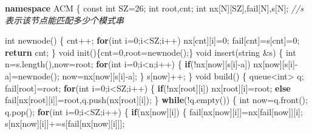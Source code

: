 \documentclass[
]{article}
\newenvironment{Shaded}{}{}
\newcommand{\AttributeTok}[1]{\textcolor[rgb]{0.49,0.56,0.16}{#1}}
\newcommand{\CharTok}[1]{\textcolor[rgb]{0.25,0.44,0.63}{#1}}
\newcommand{\CommentTok}[1]{\textcolor[rgb]{0.38,0.63,0.69}{\textit{#1}}}
\newcommand{\ControlFlowTok}[1]{\textcolor[rgb]{0.00,0.44,0.13}{\textbf{#1}}}
\newcommand{\DataTypeTok}[1]{\textcolor[rgb]{0.56,0.13,0.00}{#1}}
\newcommand{\DecValTok}[1]{\textcolor[rgb]{0.25,0.63,0.44}{#1}}
\newcommand{\KeywordTok}[1]{\textcolor[rgb]{0.00,0.44,0.13}{\textbf{#1}}}
\newcommand{\NormalTok}[1]{#1}
\begin{document}
\begin{Shaded}
\begin{Highlighting}[]
\KeywordTok{namespace}\NormalTok{ ACM}
\NormalTok{\{}
    \AttributeTok{const} \DataTypeTok{int}\NormalTok{ SZ=}\DecValTok{26}\NormalTok{;}
    \DataTypeTok{int}\NormalTok{ root,cnt;}
    \DataTypeTok{int}\NormalTok{ nx[N][SZ],fail[N],s[N];}
    \CommentTok{//s表示该节点能匹配多少个模式串}

    \DataTypeTok{int}\NormalTok{ newnode()}
\NormalTok{    \{}
\NormalTok{        cnt++;}
        \ControlFlowTok{for}\NormalTok{(}\DataTypeTok{int}\NormalTok{ i=}\DecValTok{0}\NormalTok{;i\textless{}SZ;i++)}
\NormalTok{            nx[cnt][i]=}\DecValTok{0}\NormalTok{;}
\NormalTok{        fail[cnt]=s[cnt]=}\DecValTok{0}\NormalTok{;}
        \ControlFlowTok{return}\NormalTok{ cnt;}
\NormalTok{    \}}
    \DataTypeTok{void}\NormalTok{ init()\{cnt=}\DecValTok{0}\NormalTok{,root=newnode();\}}
    \DataTypeTok{void}\NormalTok{ insert(string \&s)}
\NormalTok{    \{}
        \DataTypeTok{int}\NormalTok{ n=s.length(),now=root;}
        \ControlFlowTok{for}\NormalTok{(}\DataTypeTok{int}\NormalTok{ i=}\DecValTok{0}\NormalTok{;i\textless{}n;i++)}
\NormalTok{        \{}
            \ControlFlowTok{if}\NormalTok{(!nx[now][s[i]{-}}\CharTok{\textquotesingle{}a\textquotesingle{}}\NormalTok{])}
\NormalTok{                nx[now][s[i]{-}}\CharTok{\textquotesingle{}a\textquotesingle{}}\NormalTok{]=newnode();}
\NormalTok{            now=nx[now][s[i]{-}}\CharTok{\textquotesingle{}a\textquotesingle{}}\NormalTok{];}
\NormalTok{        \}}
\NormalTok{        s[now]++;}
\NormalTok{    \}}
    \DataTypeTok{void}\NormalTok{ build()}
\NormalTok{    \{}
\NormalTok{        queue\textless{}}\DataTypeTok{int}\NormalTok{\textgreater{} q;}
\NormalTok{        fail[root]=root;}
        \ControlFlowTok{for}\NormalTok{(}\DataTypeTok{int}\NormalTok{ i=}\DecValTok{0}\NormalTok{;i\textless{}SZ;i++)}
\NormalTok{        \{}
            \ControlFlowTok{if}\NormalTok{(!nx[root][i]) nx[root][i]=root;}
            \ControlFlowTok{else}\NormalTok{ fail[nx[root][i]]=root,q.push(nx[root][i]);}
\NormalTok{        \}}
        \ControlFlowTok{while}\NormalTok{(!q.empty())}
\NormalTok{        \{}
            \DataTypeTok{int}\NormalTok{ now=q.front(); q.pop();}
            \ControlFlowTok{for}\NormalTok{(}\DataTypeTok{int}\NormalTok{ i=}\DecValTok{0}\NormalTok{;i\textless{}SZ;i++)}
\NormalTok{            \{}
                \ControlFlowTok{if}\NormalTok{(nx[now][i])}
\NormalTok{                \{}
\NormalTok{                    fail[nx[now][i]]=nx[fail[now]][i];}
\NormalTok{                    s[nx[now][i]]+=s[fail[nx[now][i]]];}

\end{Highlighting}
\end{Shaded}
\end{document}
